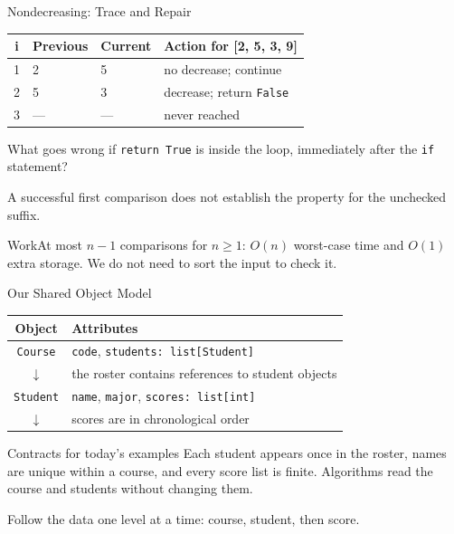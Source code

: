 \documentclass[aspectratio=169,10pt]{beamer}
\begin{document}
\begin{frame}{Nondecreasing: Trace and Repair}
\small
\begin{center}
\begin{tabular}{clll}
\textbf{i} & \textbf{Previous} & \textbf{Current} & \textbf{Action for [2, 5, 3, 9]}\\\hline
1 & 2 & 5 & no decrease; continue\\
2 & 5 & 3 & decrease; return \texttt{False}\\
3 & --- & --- & never reached
\end{tabular}
\end{center}
\begin{activity}
What goes wrong if \texttt{return True} is inside the loop, immediately after the \texttt{if} statement?
\end{activity}
\begin{keyidea}A successful first comparison does not establish the property for the unchecked suffix.\end{keyidea}
\begin{block}{Work}At most $n-1$ comparisons for $n\geq1$: $O(n)$ worst-case time and $O(1)$ extra storage. We do not need to sort the input to check it.\end{block}
\end{frame}


\begin{frame}{Our Shared Object Model}
\small
\begin{center}
\begin{tabular}{cl}
\textbf{Object} & \textbf{Attributes}\\\hline
\texttt{Course} & \texttt{code}, \texttt{students: list[Student]}\\[6pt]
$\downarrow$ & the roster contains references to student objects\\[6pt]
\texttt{Student} & \texttt{name}, \texttt{major}, \texttt{scores: list[int]}\\[6pt]
$\downarrow$ & scores are in chronological order
\end{tabular}
\end{center}
\begin{block}{Contracts for today's examples}
Each student appears once in the roster, names are unique within a course, and every score list is finite. Algorithms read the course and students without changing them.
\end{block}
\begin{keyidea}Follow the data one level at a time: course, student, then score.\end{keyidea}
\end{frame}
\end{document}
